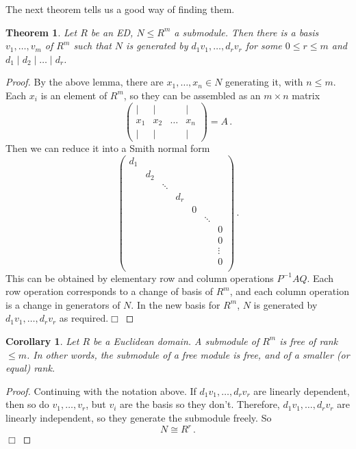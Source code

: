 \documentclass{article}
\theoremstyle{plain}\theoremheaderfont{\normalfont\itshape}\theorembodyfont{\rmfamily}\theoremseparator{.}\newtheorem*{rem}{Remark}\newtheorem*{ex}{Example}\newtheorem*{proof}{Proof}\newtheorem*{altp}{Alternative proof}\newtheorem*{nonex}{Non-Example}
\theoremstyle{plain}\theoremheaderfont{\normalfont\bfseries}\theorembodyfont{\rmfamily}\theoremseparator{.}\newtheorem{thm}{Theorem}[section]\newtheorem{lem}[thm]{Lemma}\newtheorem{prop}[thm]{Proposition}\newtheorem*{cor}{Corollary}\newtheorem{defn}[thm]{Definition}\newtheorem{clm}[thm]{Claim}\newtheorem{clminproof}{Claim}\newtheorem*{notn}{Notation}\newtheorem*{exer}{Exercise}\newtheorem*{lemnn}{Lemma}
\theoremstyle{break}\theoremheaderfont{\normalfont\itshape}\theorembodyfont{\rmfamily}\theoremseparator{.\medskip}\newtheorem*{proofskip}{Proof}\newtheorem*{exs}{Examples}\newtheorem*{rems}{Remarks}\newtheorem*{obs}{Observations}
\theoremstyle{break}\theoremheaderfont{\normalfont\bfseries}\theorembodyfont{\rmfamily}\theoremseparator{.\medskip}\newtheorem{lemskip}[thm]{Lemma}\newtheorem{defnskip}[thm]{Definition}\newtheorem{propskip}[thm]{Proposition}\newtheorem{thmskip}[thm]{Theorem}
\numberwithin{equation}{section}
\newcommand{\qed}{\hfill\ensuremath{\Box}}
\begin{document}
    The next theorem tells us a good way of finding them.
    \begin{thm}
        Let \(R\) be an ED, \(N\le R^m\) a submodule. Then there is a basis \(v_1,\dots,v_m\) of \(R^m\) such that \(N\) is generated by \(d_1v_1,\dots,d_rv_r\) for some \(0\le r\le m\) and \(d_1\mid d_2\mid \dots\mid d_r\). 
    \end{thm}
    \begin{proof}
        By the above lemma, there are \(x_1,\dots,x_n\in N\) generating it, with \(n\le m\). Each \(x_i\) is an element of \(R^m\), so they can be assembled as an \(m\times n\) matrix
        \[\begin{pmatrix}
            | & | & ~ & | \\
            x_1 & x_2 & \dots & x_n \\
            | & | & ~ & |
        \end{pmatrix}=A\,.\]
        Then we can reduce it into a Smith normal form
        \[\begin{pmatrix}
            d_1 \\
            ~ & d_2\\
            ~ & ~ & \ddots \\
            ~ & ~ & ~ & d_r\\
            ~ & ~ & ~ & ~ & 0\\
            ~ & ~ & ~ & ~ & ~ & \ddots\\
            ~ & ~ & ~ & ~ & ~ & ~ & 0\\
            ~ & ~ & ~ & ~ & ~ & ~ & 0\\
            ~ & ~ & ~ & ~ & ~ & ~ & \vdots\\
            ~ & ~ & ~ & ~ & ~ & ~ & 0\\
        \end{pmatrix}\,.\]
        This can be obtained by elementary row and column operations \(P^{-1}AQ\). Each row operation corresponds to a change of basis of \(R^m\), and each column operation is a change in generators of \(N\). In the new basis for \(R^m\), \(N\) is generated by \(d_1v_1,\dots,d_rv_r\) as required.\qed 
    \end{proof}
    \begin{cor}
        Let \(R\) be a Euclidean domain. A submodule of \(R^m\) is free of rank \(\le m\). In other words, the submodule of a free module is free, and of a smaller (or equal) rank.
    \end{cor}
    \begin{proof}
        Continuing with the notation above. If \(d_1v_1,\dots,d_rv_r\) are linearly dependent, then so do \(v_1,\dots,v_r\), but \(v_i\) are the basis so they don't. Therefore, \(d_1v_1,\dots,d_rv_r\) are linearly independent, so they generate the submodule freely. So
        \[N\cong R^r\,.\]\qed
    \end{proof}
\end{document}
